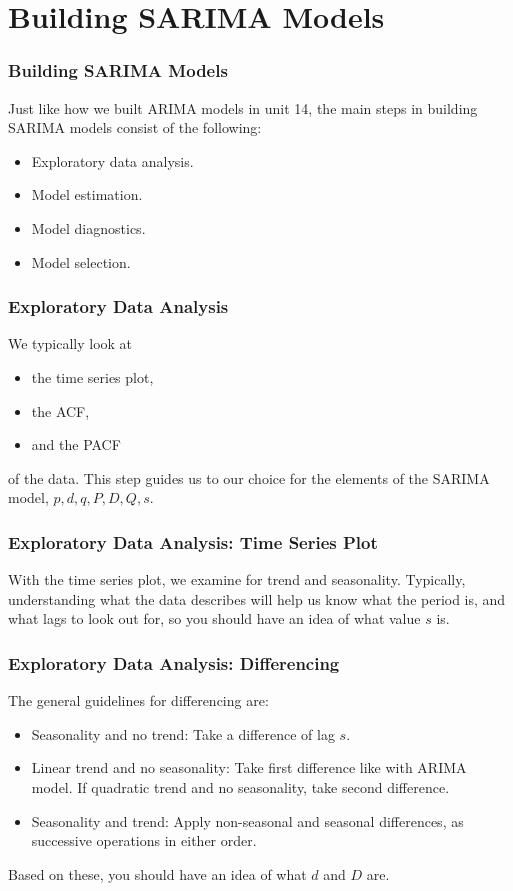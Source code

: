 \documentclass[%
xcolor=pdftex]{beamer}
\begin{document}
\section{Building SARIMA Models}
\frame{\tableofcontents[currentsection]}

\begin{frame}
\frametitle{Building SARIMA Models}

Just like how we built ARIMA models in unit 14, the main steps in building SARIMA models consist of the following:

\begin{itemize}
\item Exploratory data analysis.
\item Model estimation.
\item Model diagnostics.
\item Model selection.
\end{itemize}


\end{frame}


\begin{frame}
\frametitle{Exploratory Data Analysis}

We typically look at

\begin{itemize}
\item the time series plot,
\item the ACF,
\item and the PACF
\end{itemize}

of the data. This step guides us to our choice for the elements of the SARIMA model, $p,d,q, P, D, Q, s$.


\end{frame}

\begin{frame}
\frametitle{Exploratory Data Analysis: Time Series Plot}

With the time series plot, we examine for trend and seasonality. Typically, understanding what the data describes will help us know what the period is, and what lags to look out for, so you should have an idea of what value $s$ is.


\end{frame}

\begin{frame}
\frametitle{Exploratory Data Analysis: Differencing}

The general guidelines for differencing are:

\begin{itemize}
\item Seasonality and no trend: Take a difference of lag $s$.
\item Linear trend and no seasonality: Take first difference like with ARIMA model. If quadratic trend and no seasonality, take second difference.
\item Seasonality and trend: Apply non-seasonal and seasonal differences, as successive operations in either order.
\end{itemize}

Based on these, you should have an idea of what $d$ and $D$ are.

\end{frame}
\end{document}
